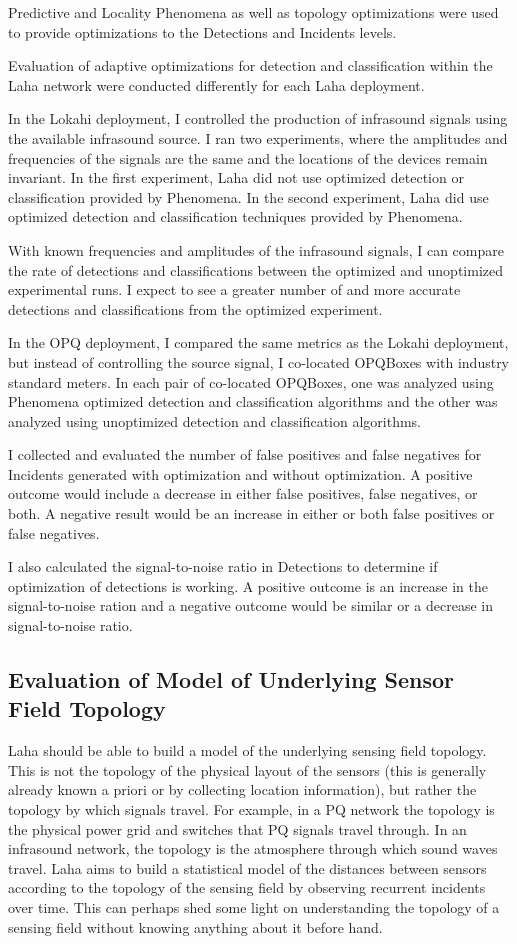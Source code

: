 Predictive and Locality Phenomena as well as topology optimizations were used to provide optimizations to the Detections and Incidents levels.

Evaluation of adaptive optimizations for detection and classification within the Laha network were conducted differently for each Laha deployment.

In the Lokahi deployment, I controlled the production of infrasound signals using the available infrasound source. I ran two experiments, where the amplitudes and frequencies of the signals are the same and the locations of the devices remain invariant. In the first experiment, Laha did not use optimized detection or classification provided by Phenomena. In the second experiment, Laha did use optimized detection and classification techniques provided by Phenomena.

With known frequencies and amplitudes of the infrasound signals, I can compare the rate of detections and classifications between the optimized and unoptimized experimental runs. I expect to see a greater number of and more accurate detections and classifications from the optimized experiment.

In the OPQ deployment, I compared the same metrics as the Lokahi deployment, but instead of controlling the source signal, I co-located OPQBoxes with industry standard meters. In each pair of co-located OPQBoxes, one was analyzed using Phenomena optimized detection and classification algorithms and the other was analyzed using unoptimized detection and classification algorithms.

I collected and evaluated the number of false positives and false negatives for Incidents generated with optimization and without optimization. A positive outcome would include a decrease in either false positives, false negatives, or both. A negative result would be an increase in either or both false positives or false negatives.

I also calculated the signal-to-noise ratio in Detections to determine if optimization of detections is working. A positive outcome is an increase in the signal-to-noise ration and a negative outcome would be similar or a decrease in signal-to-noise ratio.

\subsection{Evaluation of Model of Underlying Sensor Field Topology}
Laha should be able to build a model of the underlying sensing field topology. This is not the topology of the physical layout of the sensors (this is generally already known a priori or by collecting location information), but rather the topology by which signals travel. For example, in a PQ network the topology is the physical power grid and switches that PQ signals travel through. In an infrasound network, the topology is the atmosphere through which sound waves travel. Laha aims to build a statistical model of the distances between sensors according to the topology of the sensing field by observing recurrent incidents over time. This can perhaps shed some light on understanding the topology of a sensing field without knowing anything about it before hand.

